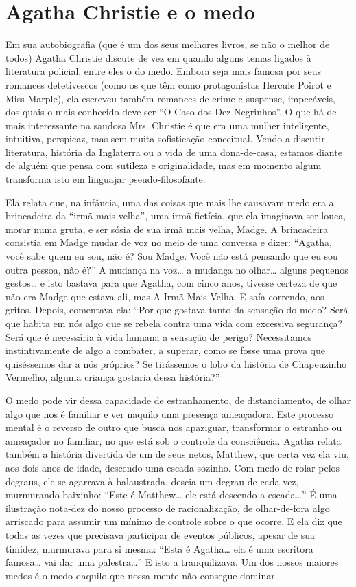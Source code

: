 \chapter{Agatha Christie e o medo}

Em sua autobiografia (que é um dos seus melhores livros, se não o
melhor de todos) Agatha Christie discute de vez em quando alguns
temas ligados à literatura policial, entre eles o do medo. Embora
seja mais famosa por seus romances detetivescos (como os que têm como
protagonistas Hercule Poirot e Miss Marple), ela escreveu também
romances de crime e suspense, impecáveis, dos quais o mais conhecido
deve ser “O Caso dos Dez Negrinhos”.  O que há de mais interessante
na saudosa Mrs. Christie é que era uma mulher inteligente, intuitiva,
perspicaz, mas sem muita sofisticação conceitual. Vendo-a discutir
literatura, história da Inglaterra ou a vida de uma dona-de-casa,
estamos diante de alguém que pensa com sutileza e originalidade, mas
em momento algum transforma isto em linguajar pseudo-filosofante.

Ela relata que, na infância, uma das coisas que mais lhe causavam medo
era a brincadeira da “irmã mais velha”, uma irmã fictícia, que ela
imaginava ser louca, morar numa gruta, e ser sósia de sua irmã mais
velha, Madge.  A brincadeira consistia em Madge mudar de voz no meio
de uma conversa e dizer: “Agatha, você sabe quem eu sou, não é? Sou
Madge. Você não está pensando que eu sou outra pessoa, não é?” A
mudança na voz… a mudança no olhar… alguns pequenos gestos… e isto
bastava para que Agatha, com cinco anos, tivesse certeza de que não
era Madge que estava ali, mas A Irmã Mais Velha. E saía correndo, aos
gritos. Depois, comentava ela: “Por que gostava tanto da sensação do
medo? Será que habita em nós algo que se rebela contra uma vida com
excessiva segurança? Será que é necessária à vida humana a sensação
de perigo? Necessitamos instintivamente de algo a combater, a
superar, como se fosse uma prova que quiséssemos dar a nós próprios?
Se tirássemos o lobo da história de Chapeuzinho Vermelho, alguma
criança gostaria dessa história?”

O medo pode vir dessa capacidade de estranhamento, de distanciamento,
de olhar algo que nos é familiar e ver naquilo uma presença
ameaçadora. Este processo mental é o reverso de outro que busca nos
apaziguar, transformar o estranho ou ameaçador no familiar, no que
está sob o controle da consciência. Agatha relata também a história
divertida de um de seus netos, Matthew, que certa vez ela viu, aos
dois anos de idade, descendo uma escada sozinho. Com medo de rolar
pelos degraus, ele se agarrava à balaustrada, descia um degrau de
cada vez, murmurando baixinho: “Este é Matthew… ele está descendo a
escada…”  É uma ilustração nota-dez do nosso processo de
racionalização, de olhar-de-fora algo arriscado para assumir um
mínimo de controle sobre o que ocorre.  E ela diz que todas as vezes
que precisava participar de eventos públicos, apesar de sua timidez,
murmurava para si mesma: “Esta é Agatha… ela é uma escritora famosa…
vai dar uma palestra…” E isto a tranquilizava.  Um dos nossos maiores
medos é o medo daquilo que nossa mente não consegue dominar.

